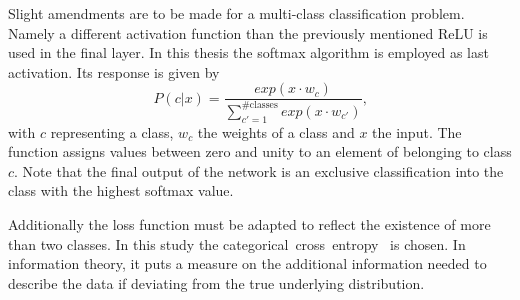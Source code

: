 Slight amendments are to be made for a multi-class classification problem. Namely a different activation function than the previously mentioned ReLU is used in the final layer. In this thesis the softmax algorithm is employed as last activation. Its response is given by
\begin{equation}
	P(c | x) = \frac{exp(x \cdot w_c)}{\sum \limits_{c' = 1}^{\#\text{classes}} exp(x \cdot w_{c'})}
	\text{,}
\end{equation}
with $c$ representing a class, $w_c$ the weights of a class and $x$ the input. The function assigns values between zero and unity to an element of belonging to class $c$. Note that the final output of the network is an exclusive classification into the class with the highest softmax value.

Additionally the loss function must be adapted to reflect the existence of more than two classes. In this study the categorical~cross~entropy~\cite{MachineLearning:LinearClassification} is chosen. In information theory, it puts a measure on the additional information needed to describe the data if deviating from the true underlying distribution.

